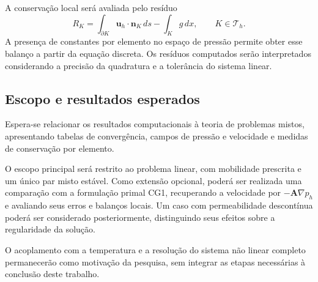 \documentclass[11pt,a4paper]{article}
\begin{document}
A conservação local será avaliada pelo resíduo
\begin{equation}
    R_K
    =
    \int_{\partial K}\mathbf{u}_h\cdot\mathbf{n}_K\,ds
    -
    \int_K g\,dx,
    \qquad K\in\mathcal{T}_h.
\end{equation}
A presença de constantes por elemento no espaço de pressão permite obter esse balanço a partir da equação discreta. Os resíduos computados serão interpretados considerando a precisão da quadratura e a tolerância do sistema linear.

\subsection{Escopo e resultados esperados}

Espera-se relacionar os resultados computacionais à teoria de problemas mistos, apresentando tabelas de convergência, campos de pressão e velocidade e medidas de conservação por elemento.

O escopo principal será restrito ao problema linear, com mobilidade prescrita e um único par misto estável. Como extensão opcional, poderá ser realizada uma comparação com a formulação primal CG1, recuperando a velocidade por $-\mathbf{A}\nabla p_h$ e avaliando seus erros e balanços locais. Um caso com permeabilidade descontínua poderá ser considerado posteriormente, distinguindo seus efeitos sobre a regularidade da solução.

O acoplamento com a temperatura e a resolução do sistema não linear completo permanecerão como motivação da pesquisa, sem integrar as etapas necessárias à conclusão deste trabalho.
\end{document}

